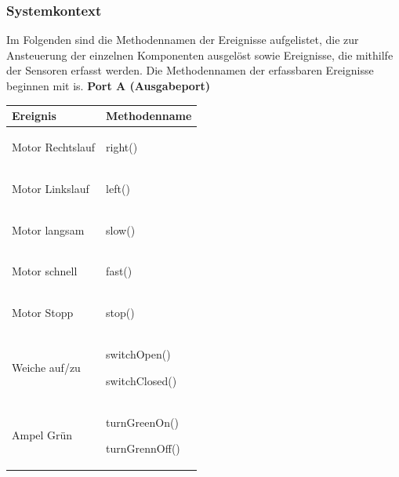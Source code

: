 \documentclass[a4paper, 11pt]{article}
\newcommand{\su}{\glqq} %
\newcommand{\so}{\grqq\xspace} %
\begin{document}
\subsubsection{Systemkontext}
Im Folgenden sind die Methodennamen der Ereignisse aufgelistet, die zur Ansteuerung der einzelnen Komponenten ausgelöst sowie Ereignisse, die mithilfe der Sensoren erfasst werden. Die Methodennamen der erfassbaren Ereignisse beginnen mit \su is\so. 
\textbf{Port A (Ausgabeport)}
\begin{table}[h]
\center
\begin{tabularx}{\textwidth}{|X|X|}
\hline
\textbf{Ereignis}&\textbf{Methodenname}\\
\hline
Motor Rechtslauf&\begin{compactenum}[]
           \item \ttfamily right()
           \end{compactenum}\\
\hline
Motor Linkslauf&\begin{compactenum}[]
           \item \ttfamily left()
           \end{compactenum}\\
\hline
Motor langsam&\begin{compactenum}[]
           \item \ttfamily slow()
           \end{compactenum}\\
\hline
Motor schnell&\begin{compactenum}[]
           \item \ttfamily fast()
           \end{compactenum}\\
\hline
Motor Stopp&\begin{compactenum}[]
           \item \ttfamily stop()
           \end{compactenum}\\
\hline
Weiche auf/zu&\begin{compactenum}[]
           \item \ttfamily switchOpen()
           \item \ttfamily switchClosed()
           \end{compactenum}\\
\hline
Ampel Grün&\begin{compactenum}[]
           \item \ttfamily turnGreenOn()
           \item \ttfamily turnGrennOff()

\end{compactenum}
\end{tabularx}
\end{table}
\end{document}
